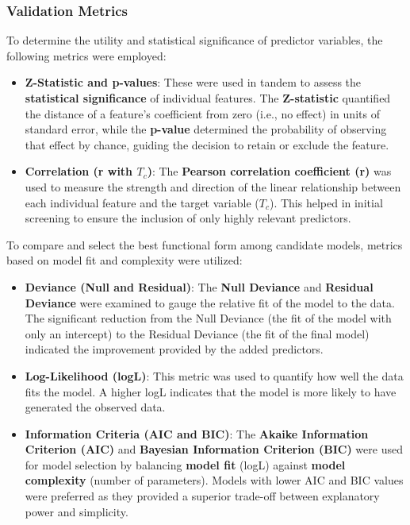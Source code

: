 \documentclass[conference]{IEEEtran}
\begin{document}
\subsubsection{\textbf{Validation Metrics}}
To determine the utility and statistical significance of predictor variables, the following metrics were employed:
\begin{itemize}
	\item \textbf{Z-Statistic and p-values}: These were used in tandem to assess the \textbf{statistical significance} of individual features. The \textbf{Z-statistic} quantified the distance of a feature's coefficient from zero (i.e., no effect) in units of standard error, while the \textbf{p-value} determined the probability of observing that effect by chance, guiding the decision to retain or exclude the feature.
	\item \textbf{Correlation (r with $T_c$)}: The \textbf{Pearson correlation coefficient (r)} was used to measure the strength and direction of the linear relationship between each individual feature and the target variable ($T_c$). This helped in initial screening to ensure the inclusion of only highly relevant predictors.\\
\end{itemize}

To compare and select the best functional form among candidate models, metrics based on model fit and complexity were utilized:
\begin{itemize}
	\item \textbf{Deviance (Null and Residual)}: The \textbf{Null Deviance} and \textbf{Residual Deviance} were examined to gauge the relative fit of the model to the data. The significant reduction from the Null Deviance (the fit of the model with only an intercept) to the Residual Deviance (the fit of the final model) indicated the improvement provided by the added predictors.
	\item \textbf{Log-Likelihood (logL)}: This metric was used to quantify how well the data fits the model. A higher logL indicates that the model is more likely to have generated the observed data.
	\item \textbf{Information Criteria (AIC and BIC)}: The \textbf{Akaike Information Criterion (AIC)} and \textbf{Bayesian Information Criterion (BIC)} were used for model selection by balancing \textbf{model fit} (logL) against \textbf{model complexity} (number of parameters). Models with lower AIC and BIC values were preferred as they provided a superior trade-off between explanatory power and simplicity.\\
\end{itemize}
\end{document}
